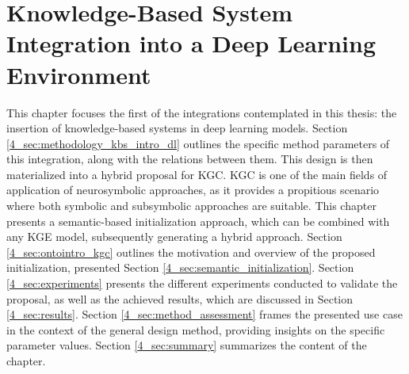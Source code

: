 \chapter{Knowledge-Based System Integration into a Deep Learning Environment}\label{chap:kbsintegrationdl}

This chapter focuses the first of the integrations contemplated in this thesis: the insertion of knowledge-based systems in deep learning models. Section \ref{4_sec:methodology_kbs_intro_dl} outlines the specific method parameters of this integration, along with the relations between them. This design is then materialized into a hybrid proposal for KGC. KGC is one of the main fields of application of neurosymbolic approaches, as it provides a propitious scenario where both symbolic and subsymbolic approaches are suitable. This chapter presents a semantic-based initialization approach, which can be combined with any KGE model, subsequently generating a hybrid approach. Section \ref{4_sec:ontointro_kgc} outlines the motivation and overview of the proposed initialization, presented Section \ref{4_sec:semantic_initialization}. Section \ref{4_sec:experiments} presents the different experiments conducted to validate the proposal, as well as the achieved results, which are discussed in Section \ref{4_sec:results}. Section \ref{4_sec:method_assessment} frames the presented use case in the context of the general design method, providing insights on the specific parameter values. Section \ref{4_sec:summary} summarizes the content of the chapter. 

